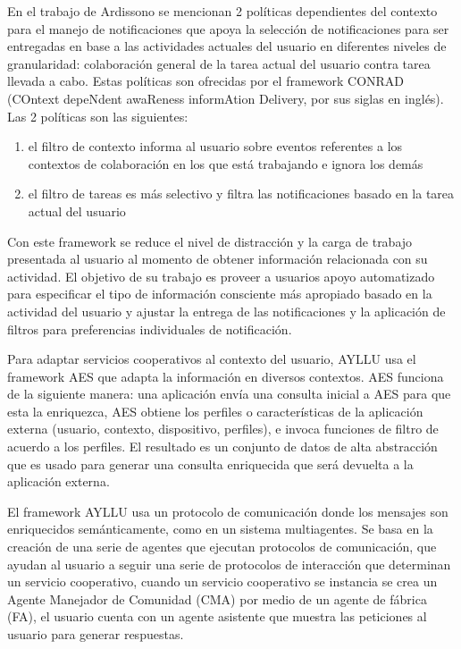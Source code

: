 {En el trabajo de Ardissono \cite{ardissono2012context} se mencionan 2 pol\'iticas dependientes del contexto para el manejo de notificaciones que apoya la selecci\'on de notificaciones para ser entregadas en base a las actividades actuales del usuario en diferentes niveles de granularidad: colaboraci\'on general de la tarea actual del usuario contra tarea llevada a cabo. Estas pol\'iticas son ofrecidas por el framework CONRAD (COntext depeNdent awaReness informAtion Delivery, por sus siglas en ingl\'es). Las 2 pol\'iticas son las siguientes:

\begin{enumerate}
\item el filtro de contexto informa al usuario sobre eventos referentes a los contextos de colaboraci\'on en los que est\'a trabajando e ignora los dem\'as
\item el filtro de tareas es m\'as selectivo y filtra las notificaciones basado en la tarea actual del usuario
\end{enumerate}

Con este framework se reduce el nivel de distracci\'on y la carga de trabajo presentada al usuario al momento de obtener informaci\'on relacionada con su actividad.
El objetivo de su trabajo es proveer a usuarios apoyo automatizado para especificar el tipo de informaci\'on consciente m\'as apropiado basado en la actividad del usuario y ajustar la entrega de las notificaciones y la aplicaci\'on de filtros para preferencias individuales de notificaci\'on.

Para adaptar servicios cooperativos al contexto del usuario, AYLLU \cite{arias2012platform} usa el framework AES que adapta la informaci\'on en diversos contextos. AES funciona de la siguiente manera: una aplicaci\'on env\'ia una consulta inicial a AES para que esta la enriquezca, AES obtiene los perfiles o caracter\'isticas de la aplicaci\'on externa (usuario, contexto, dispositivo, perfiles), e invoca funciones de filtro de acuerdo a los perfiles. El resultado es un conjunto de datos de alta abstracci\'on que es usado para generar una consulta enriquecida que ser\'a devuelta a la aplicaci\'on externa.

El framework AYLLU \cite{arias2012platform} usa un protocolo de comunicaci\'on donde los mensajes son enriquecidos sem\'anticamente, como en un sistema multiagentes. Se basa en la creaci\'on de una serie de agentes que ejecutan protocolos de  comunicaci\'on, que ayudan al usuario a seguir una serie de protocolos de interacci\'on que determinan un servicio cooperativo, cuando un servicio cooperativo se instancia se crea un Agente Manejador de Comunidad (CMA) por medio de un agente de f\'abrica (FA), el usuario cuenta con un agente asistente que muestra las peticiones al usuario para generar respuestas.

}
